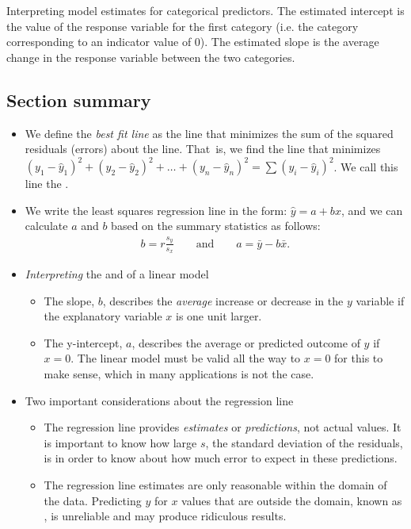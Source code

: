 \begin{onebox}{Interpreting model estimates for categorical predictors.}
The estimated intercept is the value of the response variable for the first category (i.e. the category corresponding to an indicator value of 0). The estimated slope is the average change in the response variable between the two categories.\end{onebox}


\D{\newpage}
 
\subsection*{Section summary}

\begin{itemize}
\item We define the \emph{best fit line} as the line that minimizes the sum of the squared residuals (errors) about the line.  That~is, we find the line that minimizes $(y_1 - \hat{y}_1)^2 + (y_2-\hat{y}_2)^2+ \dots + (y_n-\hat{y}_n)^2=\sum{(y_i - \hat{y}_i)^2}$. We call this line the .

\item We write the least squares regression line in the form: $\hat{y} = a  + bx$,  and we can calculate $a$ and $b$ based on the summary statistics as follows:
\begin{eqnarray*}
b=r\frac{s_y}{s_x} \qquad \text{and} \qquad a=\bar{y} - b\bar{x}.
\end{eqnarray*}

\item \emph{Interpreting} the  and  of a linear model
\begin{itemize}
\item The slope, $b$, describes the \emph{average} increase or decrease in the $y$ variable if the explanatory variable $x$ is one unit larger. 
\item The y-intercept, $a$, describes the average or predicted outcome of $y$ if $x=0$.  The linear model must be valid all the way to $x=0$ for this to make sense, which in many applications is not the case.
\end{itemize}

\item Two important considerations about the regression line
\begin{itemize}
\item  The regression line provides \textit{estimates} or \textit{predictions}, not actual values.  It is important to know how large $s$, the standard deviation of the residuals, is in order to know about how much error to expect in these predictions.
\item The regression line estimates are only reasonable within the domain of the data.  Predicting $y$ for $x$ values that are outside the domain, known as , is unreliable and may produce ridiculous results.
\end{itemize}


\end{itemize}
